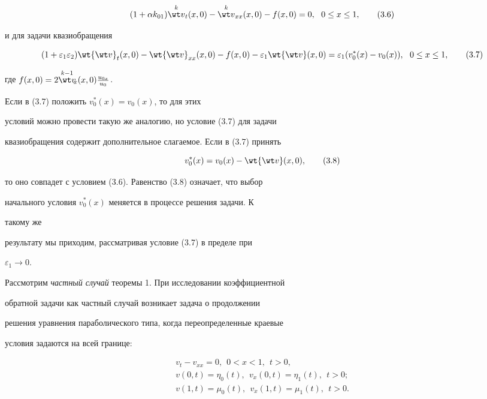 \begin{pf}
\begin{equation}
(1+\alpha k_{01})\up{k}{\wt v}_t(x,0)- 


\up{k}{\wt v}_{xx}(x,0)-f(x,0)=0,\ \ 0\le x\le 1,\tag{3.6} 


\end{equation} 


и для задачи квазиобращения 


\begin{equation} 


(1+\varepsilon_1\varepsilon_2)\wt{\wt v}_t(x,0)- 


\wt{\wt v}_{xx}(x,0)-f(x,0)-\varepsilon_1\wt{\wt v}(x,0)= 


\varepsilon_1(v^*_0(x)-v_0(x)),\ \ 0\le x\le 1,\tag{3.7} 


\end{equation} 


где $f(x,0)=2\up{k-1}{\wt v}_{\!\!x}(x,0)\frac{u_{0x}}{u_0}$. 


Если в (3.7) положить $v^*_0(x)=v_0(x)$, то для этих 


условий можно провести такую же аналогию, но условие (3.7) для задачи 


квазиобращения содержит дополнительное слагаемое. Если в (3.7) принять 


\begin{equation} 


v^*_0(x)=v_0(x)-\wt{\wt v}(x,0),\tag{3.8} 


\end{equation} 


то оно совпадет с условием (3.6). Равенство (3.8) означает, что выбор 


начального условия $v^*_0(x)$ меняется в процессе решения задачи. К 


такому же 


результату мы приходим, рассматривая условие (3.7) в пределе при 


$\varepsilon_1\to0$. 


\end{pf} 


 


Рассмотрим {\it частный случай} теоремы 1. При исследовании коэффициентной 


обратной задачи как частный случай возникает задача о продолжении 


решения уравнения параболического типа, когда переопределенные краевые 


условия задаются на всей границе: 


\begin{gather} 


v_t-v_{xx}=0,\ \ 0<x<1,\ \ t>0,\tag{3.9} \\ 


v(0,t)=\eta_0(t),\ \ v_x(0,t)=\eta_1(t),\ \ t>0;\tag{3.10} \\ 


v(1,t)=\mu_0(t),\ \ v_x(1,t)=\mu_1(t),\ \ t>0.\tag{3.11} 


\end{gather} 


